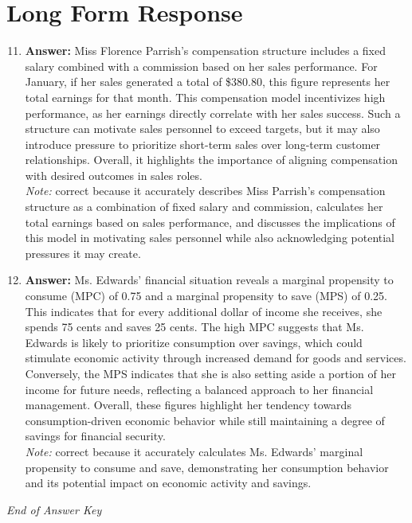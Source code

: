 \documentclass[12pt]{article}
\begin{document}
\section*{Long Form Response}
\begin{enumerate}[label=\arabic*.]
\setcounter{enumi}{10}
\item \textbf{Answer:} Miss Florence Parrish's compensation structure includes a fixed salary combined with a commission based on her sales performance. For January, if her sales generated a total of \$380.80, this figure represents her total earnings for that month. This compensation model incentivizes high performance, as her earnings directly correlate with her sales success. Such a structure can motivate sales personnel to exceed targets, but it may also introduce pressure to prioritize short-term sales over long-term customer relationships. Overall, it highlights the importance of aligning compensation with desired outcomes in sales roles.
\\ \textit{Note:} correct because it accurately describes Miss Parrish's compensation structure as a combination of fixed salary and commission, calculates her total earnings based on sales performance, and discusses the implications of this model in motivating sales personnel while also acknowledging potential pressures it may create.
\item \textbf{Answer:} Ms. Edwards' financial situation reveals a marginal propensity to consume (MPC) of 0.75 and a marginal propensity to save (MPS) of 0.25. This indicates that for every additional dollar of income she receives, she spends 75 cents and saves 25 cents. The high MPC suggests that Ms. Edwards is likely to prioritize consumption over savings, which could stimulate economic activity through increased demand for goods and services. Conversely, the MPS indicates that she is also setting aside a portion of her income for future needs, reflecting a balanced approach to her financial management. Overall, these figures highlight her tendency towards consumption-driven economic behavior while still maintaining a degree of savings for financial security.
\\ \textit{Note:} correct because it accurately calculates Ms. Edwards' marginal propensity to consume and save, demonstrating her consumption behavior and its potential impact on economic activity and savings.
\end{enumerate}

\vfill
\noindent\textit{End of Answer Key}
\end{document}
